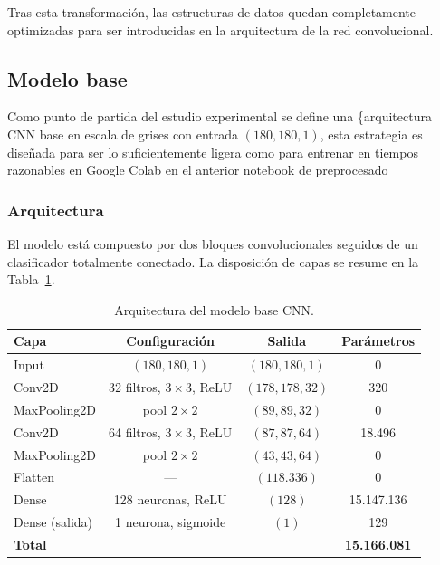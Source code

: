\documentclass[11pt, a4paper]{article}
\numberwithin{equation}{section}
\begin{document}
Tras esta transformación, las estructuras de datos quedan completamente optimizadas para ser introducidas en la arquitectura de la red convolucional.
\newpage
\subsection{Modelo base}
\label{subsec:modelo_base}

Como punto de partida del estudio experimental se define una \{arquitectura CNN base en escala de grises con entrada $(180, 180, 1)$,  esta estrategia es diseñada para ser lo suficientemente ligera como para entrenar en tiempos razonables en Google Colab en el anterior notebook de preprocesado

\subsubsection*{Arquitectura}

El modelo está compuesto por dos bloques convolucionales seguidos de un clasificador totalmente conectado. La disposición de capas se resume en la Tabla~\ref{tab:arquitectura_base}.

\begin{table}[h]
\centering
\caption{Arquitectura del modelo base CNN.}
\label{tab:arquitectura_base}
\begin{tabular}{lccc}
\toprule
\textbf{Capa} & \textbf{Configuración} & \textbf{Salida} & \textbf{Parámetros} \\
\midrule
Input             & $(180, 180, 1)$           & $(180, 180, 1)$  & 0 \\
Conv2D            & 32 filtros, $3\times3$, ReLU & $(178, 178, 32)$ & 320 \\
MaxPooling2D      & pool $2\times2$           & $(89, 89, 32)$   & 0 \\
Conv2D            & 64 filtros, $3\times3$, ReLU & $(87, 87, 64)$   & 18.496 \\
MaxPooling2D      & pool $2\times2$           & $(43, 43, 64)$   & 0 \\
Flatten           & ---                       & $(118.336)$      & 0 \\
Dense             & 128 neuronas, ReLU        & $(128)$          & 15.147.136 \\
Dense (salida)    & 1 neurona, sigmoide       & $(1)$            & 129 \\
\midrule
\textbf{Total}    &                           &                  & \textbf{15.166.081} \\
\bottomrule
\end{tabular}
\end{table}
\end{document}
